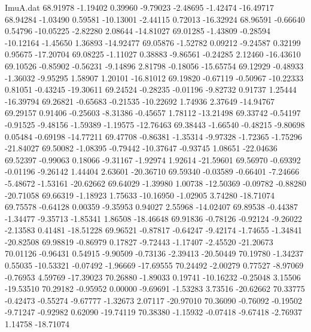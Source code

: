 \begin{filecontents}{ImuA.dat}
  68.91978   -1.19402    0.39960   -9.79023   -2.48695   -1.42474  -16.49717
  68.94284   -1.03490    0.59581  -10.13001   -2.44115    0.72013  -16.32924
  68.96591   -0.66640    0.54796  -10.05225   -2.82280    2.08644  -14.81027
  69.01285   -1.43809   -0.28594  -10.12164   -1.45650    1.36893  -14.92477
  69.05876   -1.52782    0.09212   -9.24587    0.32199    0.95675  -17.20704
  69.08225   -1.11027    0.38883   -9.86561   -0.24285    2.12460  -16.43610
  69.10526   -0.85902   -0.56231   -9.14896    2.81798   -0.18056  -15.65754
  69.12929   -0.48933   -1.36032   -9.95295    1.58907    1.20101  -16.81012
  69.19820   -0.67119   -0.50967  -10.22333    0.81051   -0.43245  -19.30611
  69.24524   -0.28235   -0.01196   -9.82732    0.91737    1.25444  -16.39794
  69.26821   -0.65683   -0.21535  -10.22692    1.74936    2.37649  -14.94767
  69.29157    0.91406   -0.25603   -8.31386   -0.45657    1.78112  -13.21498
  69.33742   -0.54197   -0.91525   -9.48156   -1.59389   -1.19575  -12.76463
  69.38443   -1.66540   -0.48215   -9.80698    0.05484   -0.69198  -14.77211
  69.47708   -0.86381   -1.35314   -9.97328   -1.72365   -1.75296  -21.84027
  69.50082   -1.08395   -0.79442  -10.37647   -0.93745    1.08651  -22.04636
  69.52397   -0.99063    0.18066   -9.31167   -1.92974    1.92614  -21.59601
  69.56970   -0.69392   -0.01196   -9.26142    1.44404    2.63601  -20.36710
  69.59340   -0.03589   -0.66401   -7.24666   -5.48672   -1.53161  -20.62662
  69.64029   -1.39980    1.00738  -12.50369   -0.09782   -0.88280  -20.71058
  69.66319   -1.18923    1.75633  -10.16950   -1.02905    3.74280  -18.71074
  69.75578   -0.64128    0.00359   -9.35953    0.94027    2.55968  -14.02407
  69.89538   -0.44387   -1.34477   -9.35713   -1.85341    1.86508  -18.46648
  69.91836   -0.78126   -0.92124   -9.26022   -2.13583    0.41481  -18.51228
  69.96521   -0.87817   -0.64247   -9.42174   -1.74655   -1.34841  -20.82508
  69.98819   -0.86979    0.17827   -9.72443   -1.17407   -2.45520  -21.20673
  70.01126   -0.96431    0.54915   -9.90509   -0.73136   -2.39413  -20.50449
  70.19780   -1.34237    0.55035  -10.53321   -0.07492   -1.96669  -17.69555
  70.24492   -2.00279    0.77527   -8.97069   -0.76953    4.59769  -17.39023
  70.26880   -1.89033    0.19741  -10.16232   -0.25048    3.15506  -19.53510
  70.29182   -0.95952    0.00000   -9.69691   -1.53283    3.73516  -20.62662
  70.33775   -0.42473   -0.55274   -9.67777   -1.32673    2.07117  -20.97010
  70.36090   -0.76092   -0.19502   -9.71247   -0.92982    0.62090  -19.74119
  70.38380   -1.15932   -0.07418   -9.67418   -2.76937    1.14758  -18.71074

\end{filecontents}
